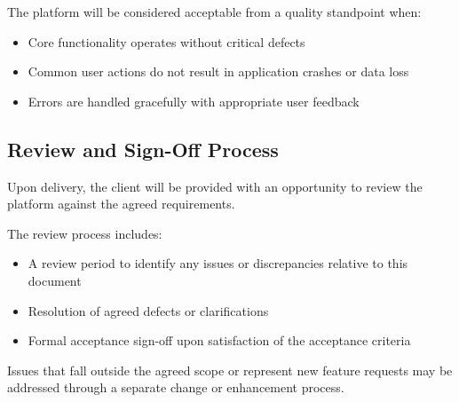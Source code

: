 The platform will be considered acceptable from a quality standpoint when:
\begin{itemize}[leftmargin=1.5em]
    \item Core functionality operates without critical defects
    \item Common user actions do not result in application crashes or data loss
    \item Errors are handled gracefully with appropriate user feedback
\end{itemize}

\subsection{Review and Sign-Off Process}

Upon delivery, the client will be provided with an opportunity to review the
platform against the agreed requirements.

The review process includes:
\begin{itemize}[leftmargin=1.5em]
    \item A review period to identify any issues or discrepancies relative to
    this document
    \item Resolution of agreed defects or clarifications
    \item Formal acceptance sign-off upon satisfaction of the acceptance criteria
\end{itemize}

Issues that fall outside the agreed scope or represent new feature requests may
be addressed through a separate change or enhancement process.
